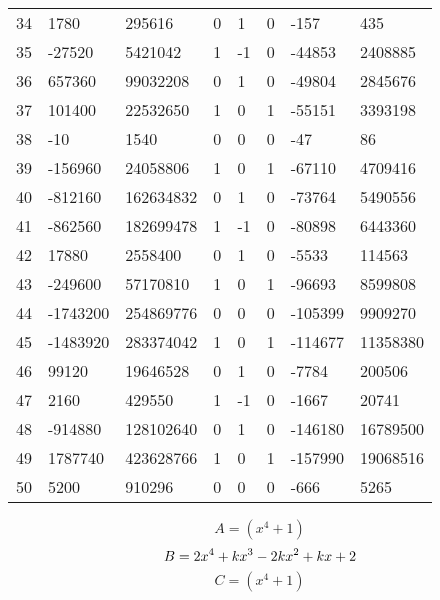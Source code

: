\documentclass{amsart}
\begin{document}
\begin{longtable}{|l|l|l|lllll|}
34&1780&295616&0&1&0&-157&435\\
35&-27520&5421042&1&-1&0&-44853&2408885\\
36&657360&99032208&0&1&0&-49804&2845676\\
37&101400&22532650&1&0&1&-55151&3393198\\
38&-10&1540&0&0&0&-47&86\\
39&-156960&24058806&1&0&1&-67110&4709416\\
40&-812160&162634832&0&1&0&-73764&5490556\\
41&-862560&182699478&1&-1&0&-80898&6443360\\
42&17880&2558400&0&1&0&-5533&114563\\
43&-249600&57170810&1&0&1&-96693&8599808\\
44&-1743200&254869776&0&0&0&-105399&9909270\\
45&-1483920&283374042&1&0&1&-114677&11358380\\
46&99120&19646528&0&1&0&-7784&200506\\
47&2160&429550&1&-1&0&-1667&20741\\
48&-914880&128102640&0&1&0&-146180&16789500\\
49&1787740&423628766&1&0&1&-157990&19068516\\
50&5200&910296&0&0&0&-666&5265\\
\hline
\end{longtable}
$$A=(x^4
 + 1)$$
$$B=2\*x^4
 + k\*x^3
 - 2\*k\*x^2
 + k\*x
 + 2$$
$$C=(x^4
 + 1)$$
\end{document}
